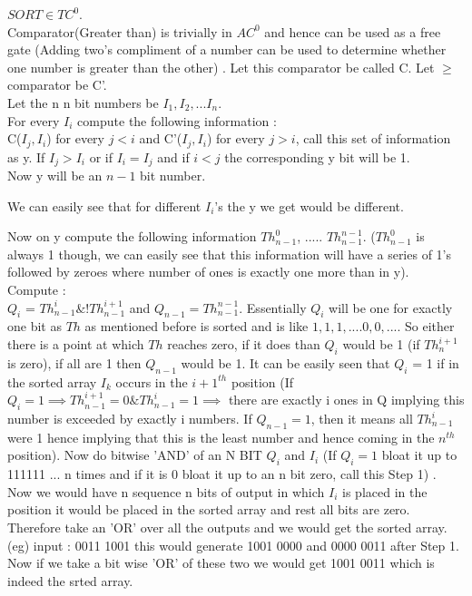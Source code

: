 \documentclass[12pt]{exam}
\begin{document}
\begin{questions}
\begin{solution}
$SORT \in TC^0$.\\
Comparator(Greater than) is trivially in $AC^0$ and hence can be used as a free gate
(Adding two's compliment of a number can be used to determine whether one number
is greater than the other)
. Let this comparator be called C. Let $\ge$ comparator be C'.\\

Let the n n bit numbers be $I_1, I_2, ... I_n$.\\

For every $I_i$ compute the following information :\\
C($I_j, I_i$) for every $j < i$ and C'($I_j, I_i$) for every $j > i$,
call this set of information
as y. If $I_j > I_i$ or if $I_i = I_j$ and
if $i < j$ the corresponding y bit will be 1.\\
Now y will be an $n-1$ bit number.


We can easily see that for different $I_i$'s the y we get would be different.

Now on y compute the following information $Th_{n-1}^{0}$, ..... $Th_{n-1}^{n-1}$.
($Th_{n-1}^{0}$ is always 1 though, we can easily see that
this information will have a series of 1's followed by zeroes where number of
ones is exactly one more than in y).\\
Compute :\\
$Q_i$ = $Th_{n-1}^{i} \& !Th_{n-1}^{i+1}$ and $Q_{n-1} = Th_{n-1}^{n-1}$.
Essentially $Q_i$ will be one for exactly one bit as $Th$ as mentioned
before is sorted and is like $1, 1, 1, .... 0, 0, ...$. So either
there is a point at which $Th$ reaches zero, if it does than $Q_i$ would be 1
(if $Th_{n}^{i+1}$ is zero), if all are 1 then $Q_{n-1}$ would be 1.
It can be easily seen that $Q_i$ = 1 if in the sorted array $I_k$
occurs in the ${i+1}^{th}$ position (If $Q_i = 1 \implies Th_{n-1}^{i+1} = 0 \& Th_{n-1}^{i} = 1
\implies$ there are exactly i ones in Q implying this number is exceeded by
exactly i numbers. If $Q_{n-1} = 1$, then it means all $Th_{n-1}^{i}$ were 1 hence implying
that this is the least number and hence coming in the $n^{th}$ position).
Now do bitwise 'AND' of an N BIT $Q_i$ and $I_i$ (If $Q_i = 1$ bloat it
up to 111111 ... n times and if it is 0 bloat it up to an n bit zero, call this Step 1) .
Now we would have n sequence n bits of output in which $I_i$ is placed in the
position it would be placed in the sorted array and rest all bits are zero.
Therefore take an 'OR' over all the outputs and we would get the sorted array.
(eg) input : 0011 1001  this would generate 1001 0000 and 0000 0011 after Step 1.
Now if we take a bit wise 'OR' of these two we would get 1001 0011 which is indeed
the srted array.\\


\end{solution}
\end{questions}
\end{document}
